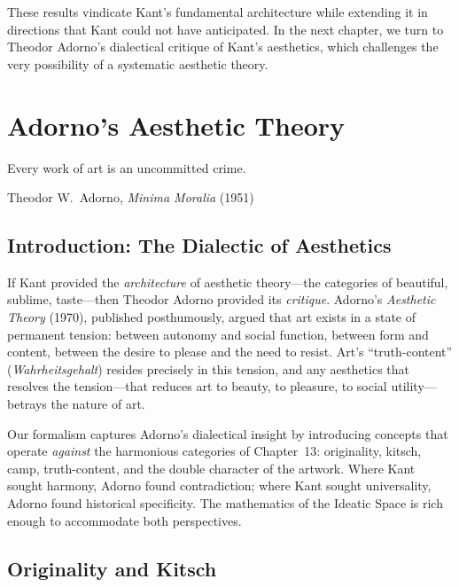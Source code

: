 These results vindicate Kant's fundamental architecture while extending it
in directions that Kant could not have anticipated.  In the next chapter,
we turn to Theodor Adorno's dialectical critique of Kant's aesthetics, which
challenges the very possibility of a systematic aesthetic theory.



\chapter{Adorno's Aesthetic Theory}
\label{ch:adorno}

\epigraph{Every work of art is an uncommitted crime.}%
{Theodor W.\ Adorno, \emph{Minima Moralia} (1951)}

\section{Introduction: The Dialectic of Aesthetics}

If Kant provided the \emph{architecture} of aesthetic theory---the
categories of beautiful, sublime, taste---then Theodor Adorno provided its
\emph{critique}.  Adorno's \emph{Aesthetic Theory} (1970), published
posthumously, argued that art exists in a state of permanent tension: between
autonomy and social function, between form and content, between
the desire to please and the need to resist.  Art's ``truth-content''
(\emph{Wahrheitsgehalt}) resides precisely in this tension, and any
aesthetics that resolves the tension---that reduces art to beauty, to
pleasure, to social utility---betrays the nature of art.

Our formalism captures Adorno's dialectical insight by introducing concepts
that operate \emph{against} the harmonious categories of Chapter~13:
originality, kitsch, camp, truth-content, and the double character of
the artwork.  Where Kant sought harmony, Adorno found contradiction;
where Kant sought universality, Adorno found historical specificity.  The
mathematics of the Ideatic Space is rich enough to accommodate both
perspectives.

\section{Originality and Kitsch}
\label{sec:adorno:originality}

